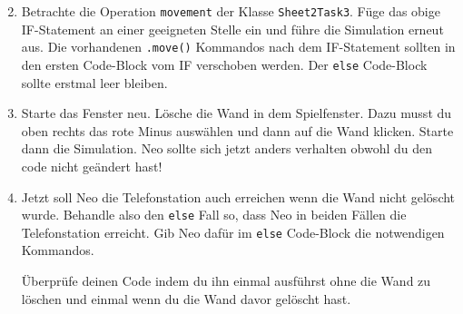 \begin{enumerate} \setcounter{enumi}{1}
    \item Betrachte die Operation \lstinline{movement} der Klasse \lstinline{Sheet2Task3}. 
        Füge das obige IF-Statement an einer geeigneten Stelle ein und führe die Simulation erneut aus.
        Die vorhandenen \lstinline{.move()} Kommandos nach dem IF-Statement sollten in den ersten Code-Block vom IF verschoben werden.
        Der \lstinline{else} Code-Block sollte erstmal leer bleiben.
    \item Starte das Fenster neu.
        Lösche die Wand in dem Spielfenster.
        Dazu musst du oben rechts das rote Minus auswählen und dann auf die Wand klicken.
        Starte dann die Simulation.
        Neo sollte sich jetzt anders verhalten obwohl du den code nicht geändert hast!
    \item Jetzt soll Neo die Telefonstation auch erreichen wenn die Wand nicht gelöscht wurde.
        Behandle also den \lstinline{else} Fall so, dass Neo in beiden Fällen die Telefonstation erreicht.
        Gib Neo dafür im \lstinline{else} Code-Block die notwendigen Kommandos.

        Überprüfe deinen Code indem du ihn einmal ausführst ohne die Wand zu löschen und einmal wenn du die Wand davor gelöscht hast.

\end{enumerate}
